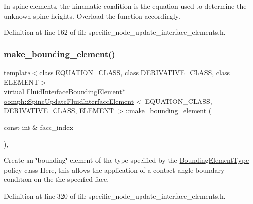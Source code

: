 In spine elements, the kinematic condition is the equation used to determine the unknown spine heights. Overload the function accordingly. 



Definition at line 162 of file specific\+\_\+node\+\_\+update\+\_\+interface\+\_\+elements.\+h.

\mbox{\label{classoomph_1_1SpineUpdateFluidInterfaceElement_a8e464c689a19ce2d6fbff2c167dcc41a}} 
\subsubsection{\texorpdfstring{make\+\_\+bounding\+\_\+element()}{make\_bounding\_element()}}
{\footnotesize\ttfamily template$<$class E\+Q\+U\+A\+T\+I\+O\+N\+\_\+\+C\+L\+A\+SS, class D\+E\+R\+I\+V\+A\+T\+I\+V\+E\+\_\+\+C\+L\+A\+SS, class E\+L\+E\+M\+E\+NT$>$ \\
virtual \hyperlink{classoomph_1_1FluidInterfaceBoundingElement}{Fluid\+Interface\+Bounding\+Element}$\ast$ \hyperlink{classoomph_1_1SpineUpdateFluidInterfaceElement}{oomph\+::\+Spine\+Update\+Fluid\+Interface\+Element}$<$ E\+Q\+U\+A\+T\+I\+O\+N\+\_\+\+C\+L\+A\+SS, D\+E\+R\+I\+V\+A\+T\+I\+V\+E\+\_\+\+C\+L\+A\+SS, E\+L\+E\+M\+E\+NT $>$\+::make\+\_\+bounding\+\_\+element (\begin{DoxyParamCaption}\item[{const int \&}]{face\+\_\+index }\end{DoxyParamCaption})\hspace{0.3cm}{\ttfamily [inline]}, {\ttfamily [virtual]}}



Create an \char`\"{}bounding\char`\"{} element of the type specified by the \hyperlink{classoomph_1_1BoundingElementType}{Bounding\+Element\+Type} policy class Here, this allows the application of a contact angle boundary condition on the the specified face. 



Definition at line 320 of file specific\+\_\+node\+\_\+update\+\_\+interface\+\_\+elements.\+h.

